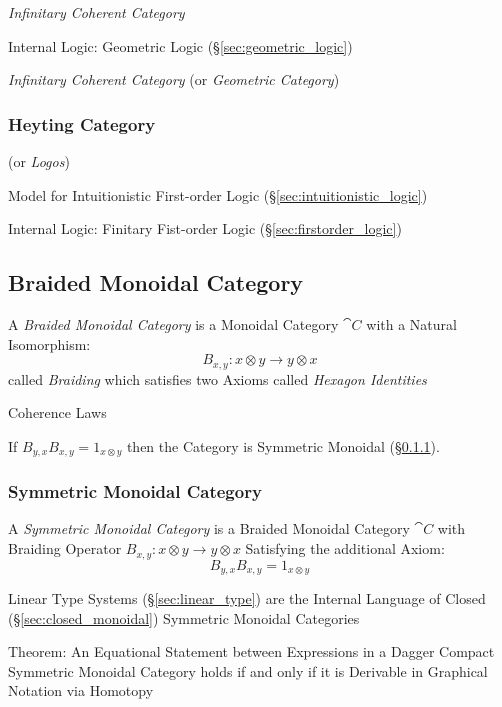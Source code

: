 \emph{Infinitary Coherent Category}

Internal Logic: Geometric Logic (\S\ref{sec:geometric_logic})

\emph{Infinitary Coherent Category} (or \emph{Geometric Category})



\subsubsection{Heyting Category}\label{sec:heyting_category}

(or \emph{Logos})

Model for Intuitionistic First-order Logic
(\S\ref{sec:intuitionistic_logic})

Internal Logic: Finitary Fist-order Logic
(\S\ref{sec:firstorder_logic})



\subsection{Braided Monoidal Category}\label{sec:braided_monoidal}

A \emph{Braided Monoidal Category} is a Monoidal Category $\cat{C}$
with a Natural Isomorphism:
\[
  B_{x,y} : x \otimes y \rightarrow y \otimes x
\]
called \emph{Braiding} which satisfies two Axioms called \emph{Hexagon
  Identities} %

Coherence Laws

If $B_{y,x} B_{x,y} = 1_{x \otimes y}$ then the Category is Symmetric
Monoidal (\S\ref{sec:symmetric_monoidal}).



\subsubsection{Symmetric Monoidal Category}
\label{sec:symmetric_monoidal}

A \emph{Symmetric Monoidal Category} is a Braided Monoidal Category
$\cat{C}$ with Braiding Operator $B_{x,y} : x \otimes y \rightarrow y
\otimes x$ Satisfying the additional Axiom:
\[
  B_{y,x} B_{x,y} = 1_{x \otimes y}
\]

Linear Type Systems (\S\ref{sec:linear_type}) are the Internal
Language of Closed (\S\ref{sec:closed_monoidal}) Symmetric Monoidal
Categories

Theorem: An Equational Statement between Expressions in a Dagger
Compact Symmetric Monoidal Category holds if and only if it is
Derivable in Graphical Notation via Homotopy %

